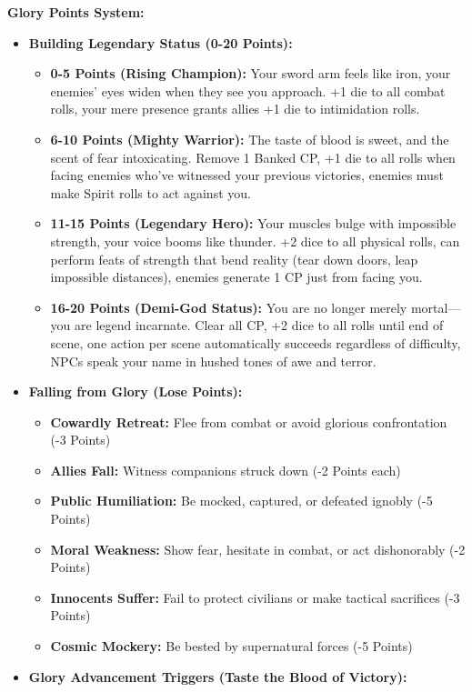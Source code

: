 \documentclass[11pt]{article}
\begin{document}
\textbf{Glory Points System:}
\begin{itemize}
\item \textbf{Building Legendary Status (0-20 Points):}
  \begin{itemize}
  \item \textbf{0-5 Points (Rising Champion):} Your sword arm feels like iron, your enemies' eyes widen when they see you approach. +1 die to all combat rolls, your mere presence grants allies +1 die to intimidation rolls.
  \item \textbf{6-10 Points (Mighty Warrior):} The taste of blood is sweet, and the scent of fear intoxicating. Remove 1 Banked CP, +1 die to all rolls when facing enemies who've witnessed your previous victories, enemies must make Spirit rolls to act against you.
  \item \textbf{11-15 Points (Legendary Hero):} Your muscles bulge with impossible strength, your voice booms like thunder. +2 dice to all physical rolls, can perform feats of strength that bend reality (tear down doors, leap impossible distances), enemies generate 1 CP just from facing you.
  \item \textbf{16-20 Points (Demi-God Status):} You are no longer merely mortal—you are legend incarnate. Clear all CP, +2 dice to all rolls until end of scene, one action per scene automatically succeeds regardless of difficulty, NPCs speak your name in hushed tones of awe and terror.
  \end{itemize}
\item \textbf{Falling from Glory (Lose Points):}
  \begin{itemize}
  \item \textbf{Cowardly Retreat:} Flee from combat or avoid glorious confrontation (-3 Points)
  \item \textbf{Allies Fall:} Witness companions struck down (-2 Points each)
  \item \textbf{Public Humiliation:} Be mocked, captured, or defeated ignobly (-5 Points)
  \item \textbf{Moral Weakness:} Show fear, hesitate in combat, or act dishonorably (-2 Points)
  \item \textbf{Innocents Suffer:} Fail to protect civilians or make tactical sacrifices (-3 Points)
  \item \textbf{Cosmic Mockery:} Be bested by supernatural forces (-5 Points)
  \end{itemize}
\item \textbf{Glory Advancement Triggers (Taste the Blood of Victory):}

\end{itemize}
\end{document}
